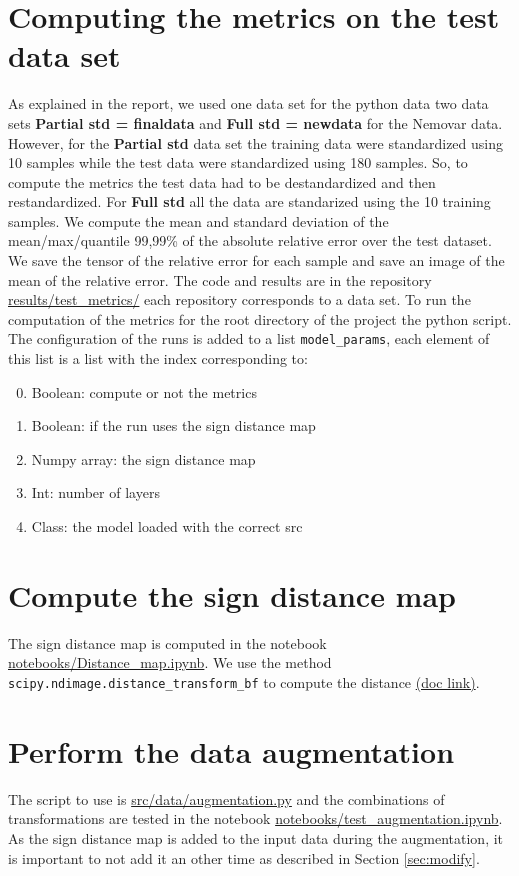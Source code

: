 \documentclass[11pt]{article}
\begin{document}
\section{Computing the metrics on the test data set}
\label{sec:org39d8668}


As explained in the report, we used one data set for the python data two data sets \textbf{Partial std = finaldata} and \textbf{Full std = newdata} for the Nemovar data. However, for the \textbf{Partial std} data set the training data were standardized using 10 samples while the test data were standardized using 180 samples. So, to compute the metrics the test data had to be destandardized and then restandardized. For \textbf{Full std} all the data are standarized using the 10 training samples.
We compute the mean and standard deviation of the mean/max/quantile 99,99\% of the absolute relative error over the test dataset. We save the tensor of the relative error for each sample and save an image of the mean of the relative error. The code and results are in the repository \url{results/test\_metrics/} each repository corresponds to a data set. To run the computation of the metrics for the root directory of the project the python script. The configuration of the runs is added to a list \texttt{model\_params}, each element of this list is a list with the index corresponding to:
\begin{enumerate}
\setcounter{enumi}{-1}
\item Boolean: compute or not the metrics
\item Boolean: if the run uses the sign distance map
\item Numpy array: the sign distance map
\item Int: number of layers
\item Class: the model loaded with the correct src
\end{enumerate}

\section{Compute the sign distance map}
\label{sec:orgfcb22da}

The sign distance map is computed in the notebook \url{notebooks/Distance\_map.ipynb}. We use the method \texttt{scipy.ndimage.distance\_transform\_bf} to compute the distance \href{https://docs.scipy.org/doc/scipy/reference/generated/scipy.ndimage.distance\_transform\_bf.html}{(doc link)}.

\section{Perform the data augmentation}
\label{sec:org6ed8b99}

The script to use is \url{src/data/augmentation.py} and the combinations of transformations are tested in the notebook \url{notebooks/test\_augmentation.ipynb}. As the sign distance map is added to the input data during the augmentation, it is important to not add it an other time as described in Section \ref{sec:modify}.
\end{document}
